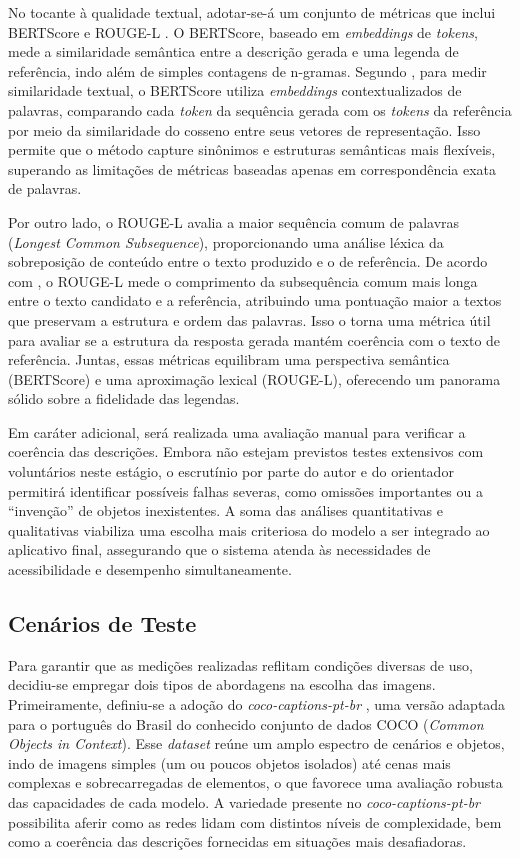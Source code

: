 No tocante à qualidade textual, adotar-se-á um conjunto de métricas que inclui BERTScore \cite{Zhang2020:} e ROUGE-L \cite{lin-2004-rouge}. O BERTScore, baseado em \textit{embeddings} de \textit{tokens}, mede a similaridade semântica entre a descrição gerada e uma legenda de referência, indo além de simples contagens de n-gramas. Segundo , para medir similaridade textual, o BERTScore utiliza \textit{embeddings} contextualizados de palavras, comparando cada \textit{token} da sequência gerada com os \textit{tokens} da referência por meio da similaridade do cosseno entre seus vetores de representação. Isso permite que o método capture sinônimos e estruturas semânticas mais flexíveis, superando as limitações de métricas baseadas apenas em correspondência exata de palavras.

Por outro lado, o ROUGE-L avalia a maior sequência comum de palavras (\textit{Longest Common Subsequence}), proporcionando uma análise léxica da sobreposição de conteúdo entre o texto produzido e o de referência. De acordo com , o ROUGE-L mede o comprimento da subsequência comum mais longa entre o texto candidato e a referência, atribuindo uma pontuação maior a textos que preservam a estrutura e ordem das palavras. Isso o torna uma métrica útil para avaliar se a estrutura da resposta gerada mantém coerência com o texto de referência. Juntas, essas métricas equilibram uma perspectiva semântica (BERTScore) e uma aproximação lexical (ROUGE-L), oferecendo um panorama sólido sobre a fidelidade das legendas.

Em caráter adicional, será realizada uma avaliação manual para verificar a coerência das descrições. Embora não estejam previstos testes extensivos com voluntários neste estágio, o escrutínio por parte do autor e do orientador permitirá identificar possíveis falhas severas, como omissões importantes ou a “invenção” de objetos inexistentes. A soma das análises quantitativas e qualitativas viabiliza uma escolha mais criteriosa do modelo a ser integrado ao aplicativo final, assegurando que o sistema atenda às necessidades de acessibilidade e desempenho simultaneamente.

\subsection{Cenários de Teste}

Para garantir que as medições realizadas reflitam condições diversas de uso, decidiu-se empregar dois tipos de abordagens na escolha das imagens. Primeiramente, definiu-se a adoção do \textit{coco-captions-pt-br} \cite{bromonschenkel2024cocopt}, uma versão adaptada para o português do Brasil do conhecido conjunto de dados COCO (\textit{Common Objects in Context}). Esse \textit{dataset} reúne um amplo espectro de cenários e objetos, indo de imagens simples (um ou poucos objetos isolados) até cenas mais complexas e sobrecarregadas de elementos, o que favorece uma avaliação robusta das capacidades de cada modelo. A variedade presente no \textit{coco-captions-pt-br} possibilita aferir como as redes lidam com distintos níveis de complexidade, bem como a coerência das descrições fornecidas em situações mais desafiadoras.

